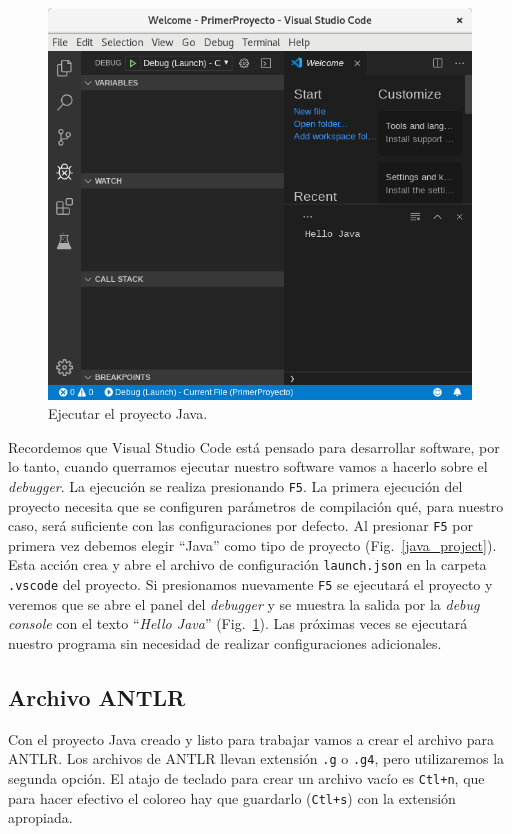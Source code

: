 \documentclass[a5paper,10pt]{article}
\begin{document}
\begin{figure}[t]
	\centering
	\includegraphics[width=.95\textwidth]{PrimeraEjecucion}
	\caption{Ejecutar el proyecto Java.}
	\label{hello_java}
\end{figure}


Recordemos que Visual Studio Code está pensado para desarrollar software, por lo tanto, cuando querramos ejecutar nuestro software vamos a hacerlo sobre el \emph{debugger}.  La ejecución se realiza presionando \verb|F5|.  La primera ejecución del proyecto necesita que se configuren parámetros de compilación qué, para nuestro caso, será suficiente con las configuraciones por defecto.  Al presionar \verb|F5| por primera vez debemos elegir ``Java'' como tipo de proyecto  (Fig.~\ref{java_project}).  Esta acción crea y abre el archivo de configuración \verb|launch.json| en la carpeta \verb|.vscode| del proyecto.  Si presionamos nuevamente \verb|F5| se ejecutará el proyecto y veremos que se abre el panel del \emph{debugger} y se muestra la salida por la \emph{debug console} con el texto ``\emph{Hello Java}'' (Fig.~\ref{hello_java}).  Las próximas veces se ejecutará nuestro programa sin necesidad de realizar configuraciones adicionales.


\subsection{Archivo ANTLR}
\label{archivo_antlr}

Con el proyecto Java creado y listo para trabajar vamos a crear el archivo para ANTLR. Los archivos de ANTLR llevan extensión \verb|.g| o \verb|.g4|, pero utilizaremos la segunda opción.  El atajo de teclado para crear un archivo vacío es \verb|Ctl+n|, que para hacer efectivo el coloreo hay que guardarlo (\verb|Ctl+s|) con la extensión apropiada.
\end{document}
